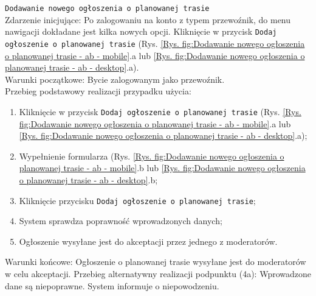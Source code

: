 \pagebreak
\texttt{Dodawanie nowego ogłoszenia o planowanej trasie} \\
Zdarzenie inicjujące: Po zalogowaniu na konto z typem przewoźnik, do menu nawigacji dokładane jest kilka nowych opcji. Kliknięcie w przycisk \texttt{Dodaj ogłoszenie o planowanej trasie} (Rys. \ref{Rys. fig:Dodawanie nowego ogłoszenia o planowanej trasie - ab - mobile}.a lub \ref{Rys. fig:Dodawanie nowego ogłoszenia o planowanej trasie - ab - desktop}.a). \\
Warunki początkowe: Bycie zalogowanym jako przewoźnik. \\
Przebieg podstawowy realizacji przypadku użycia:
\begin{enumerate}
    \item Kliknięcie w przycisk \texttt{Dodaj ogłoszenie o planowanej trasie} (Rys. \ref{Rys. fig:Dodawanie nowego ogłoszenia o planowanej trasie - ab - mobile}.a lub \ref{Rys. fig:Dodawanie nowego ogłoszenia o planowanej trasie - ab - desktop}.a);
    \item Wypełnienie formularza (Rys. \ref{Rys. fig:Dodawanie nowego ogłoszenia o planowanej trasie - ab - mobile}.b lub \ref{Rys. fig:Dodawanie nowego ogłoszenia o planowanej trasie - ab - desktop}.b;
    \item Kliknięcie przycisku \texttt{Dodaj ogłoszenie o planowanej trasie};
    \item System sprawdza poprawność wprowadzonych danych;
    \item Ogłoszenie wysyłane jest do akceptacji przez jednego z moderatorów.
\end{enumerate}
Warunki końcowe: Ogłoszenie o planowanej trasie wysyłane jest do moderatorów w celu akceptacji.
Przebieg alternatywny realizacji podpunktu (4a): Wprowadzone dane są niepoprawne. System informuje o niepowodzeniu. \\
